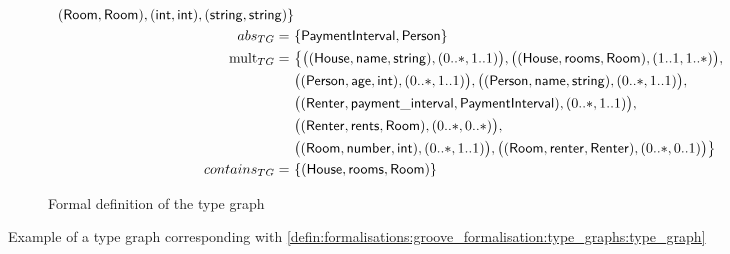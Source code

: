 \begin{figure}[p]
\begin{subfigure}{\textwidth}
\begin{align*}
                ( \mathsf{Room}, \mathsf{Room} ),
                ( \mathsf{int}, \mathsf{int} ),
                ( \mathsf{string}, \mathsf{string} )
            \}\\
            abs_{TG} =\ & \{ 
                \mathsf{PaymentInterval}, \mathsf{Person}
            \}\\
            \mathrm{mult}_{TG} =\ & \big\{ 
                \big( ( \mathsf{House}, \mathsf{name}, \mathsf{string} ), ( 0..*, 1..1 ) \big),
                \big( ( \mathsf{House}, \mathsf{rooms}, \mathsf{Room} ), ( 1..1, 1..* ) \big),\\&
                \big( ( \mathsf{Person}, \mathsf{age}, \mathsf{int} ), ( 0..*, 1..1 ) \big),
                \big( ( \mathsf{Person}, \mathsf{name}, \mathsf{string} ), ( 0..*, 1..1 ) \big),\\&
                \big( ( \mathsf{Renter}, \mathsf{payment\_interval}, \mathsf{PaymentInterval} ), ( 0..*, 1..1 ) \big),\\&
                \big( ( \mathsf{Renter}, \mathsf{rents}, \mathsf{Room} ), ( 0..*, 0..* ) \big),\\&
                \big( ( \mathsf{Room}, \mathsf{number}, \mathsf{int} ), ( 0..*, 1..1 ) \big),
                \big( ( \mathsf{Room}, \mathsf{renter}, \mathsf{Renter} ), ( 0..*, 0..1 ) \big)
            \big\}\\
            contains_{TG} =\ & \{ 
                ( \mathsf{House}, \mathsf{rooms}, \mathsf{Room} )
            \}
        \end{align*}
        \caption{Formal definition of the type graph}
    \end{subfigure}
    \caption{Example of a type graph corresponding with \cref{defin:formalisations:groove_formalisation:type_graphs:type_graph}}
    \label{fig:formalisations:groove_formalisation:type_graphs:type_graph_example}
\end{figure}

